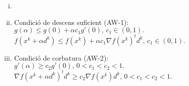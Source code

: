 \begin{prop} \label{prop:arm}
    \begin{enumerate}[i)]
        \item[]
        \item Condici\'o de descens suficient (AW-1): \\
            $g\left( \alpha \right) \leq g\left( 0 \right) + \alpha c_1g'\left( 0 \right),\, c_1 \in (0,1).$ \\
            $f\left( x^k + \alpha d^k \right) \leq f\left( x^k \right) + \alpha c_1 \nabla f\left( x^k \right)^t d^k,\, c_1 \in (0,1).$
        \item Condici\'o de corbatura (AW-2): \\
            $g'\left( \alpha \right) \geq c_2 g'\left( 0 \right),\, 0 < c_1 < c_2 < 1.$ \\
            $\nabla f\left( x^k + \alpha d^k \right)^td^k \geq c_2 \nabla f\left( x^k \right)d^k,\, 0 < c_1 < c_2 < 1$.
    \end{enumerate}
\end{prop}
